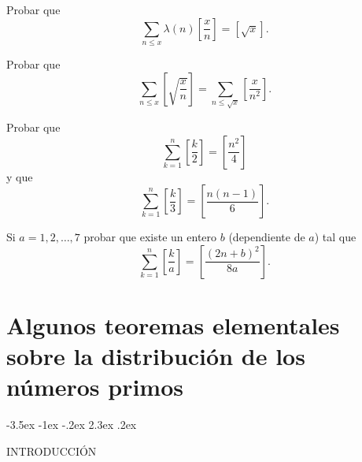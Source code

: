 \documentclass[12pt,a4paper]{book}
\makeatletter
\renewcommand\section{\@startsection{section}{1}{\z@}%
  {-3.5ex \@plus -1ex \@minus -.2ex}%
  {2.3ex \@plus .2ex}%
  {\normalfont\Large\bfseries\raggedright}}
\makeatother
\begin{document}
    \begin{ejercicio}
        Probar que
        \begin{equation*}
            \sum_{n\leq x}\lambda(n)\left[\frac{x}{n}\right]=[\sqrt{x}].
        \end{equation*}
    \end{ejercicio}

    \begin{ejercicio}
        Probar que
        \begin{equation*}
            \sum_{n\leq x}\left[\sqrt{\frac{x}{n}}\right]=\sum_{n\leq\sqrt{x}}\left[\frac{x}{n^{2}}\right].
        \end{equation*}
    \end{ejercicio}

    \begin{ejercicio}
        Probar que
        \begin{equation*}
            \sum_{k=1}^{n}\left[\frac{k}{2}\right]=\left[\frac{n^{2}}{4}\right]
        \end{equation*}
        y que
        \begin{equation*}
            \sum_{k=1}^{n}\left[\frac{k}{3}\right]=\left[\frac{n(n-1)}{6}\right].
        \end{equation*}
    \end{ejercicio}

    \begin{ejercicio}
        Si $a=1,2,\dots,7$ probar que existe un entero $b$ (dependiente de $a$) tal que
        \begin{equation*}
            \sum_{k=1}^{n}\left[\frac{k}{a}\right]=\left[\frac{(2n+b)^{2}}{8a}\right].
        \end{equation*}
    \end{ejercicio}

\chapter[Teoremas elementales sobre los primos]{Algunos teoremas elementales sobre la distribución de los números primos}

    \section{INTRODUCCIÓN}
\end{document}
